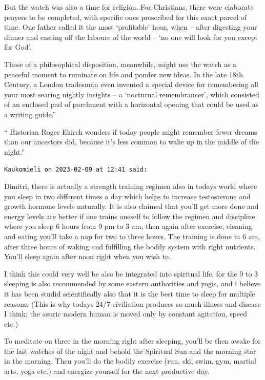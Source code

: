 \begin{footnotesize}
\begin{sffamily}
But the watch was also a time for religion. For Christians, there were elaborate prayers to be completed, with specific ones prescribed for this exact parcel of time. One father called it the most `profitable' hour, when -- after digesting your dinner and casting off the labours of the world -- `no one will look for you except for God'.

Those of a philosophical disposition, meanwhile, might use the watch as a peaceful moment to ruminate on life and ponder new ideas. In the late 18th Century, a London tradesman even invented a special device for remembering all your most searing nightly insights -- a `nocturnal remembrancer', which consisted of an enclosed pad of parchment with a horizontal opening that could be used as a writing guide.''

`` Historian Roger Ekirch wonders if today people might remember fewer dreams than our ancestors did, because it's less common to wake up in the middle of the night.''

\hfill

\texttt{Kaukomieli on 2023-02-09 at 12:41 said:}

Dimitri, there is actually a strength training regimen also in todays world where you sleep in two different times a day which helps to increase testosterone and growth hormone levels naturally. It is also claimed that you'll get more done and energy levels are better if one trains oneself to follow the regimen and discipline where you sleep 6 hours from 9 pm to 3 am, then again after exercise, cleaning and eating you'll take a nap for two to three hours. The training is done in 6 am, after three hours of waking and fulfilling the bodily system with right nutrients. You'll sleep again after noon right when you wish to.

I think this could very well be also be integrated into spiritual life, for the 9 to 3 sleeping is also recommended by some eastern authorities and yogis, and i believe it has been studid scientifically also that it is the best time to sleep for multiple reasons. (This is why todays 24/7 civiliation produces so much illness and disease I think; the asuric modern human is moved only by constant agitation, speed etc.)

To meditate on three in the morning right after sleeping, you'll be then awake for the last watches of the night and behold the Spiritual Sun and the morning star in the morning. Then you'll do the bodily exercise (run, ski, swim, gym, martial arts, yoga etc.) and energize yourself for the next productive day.


\end{sffamily}
\end{footnotesize}
